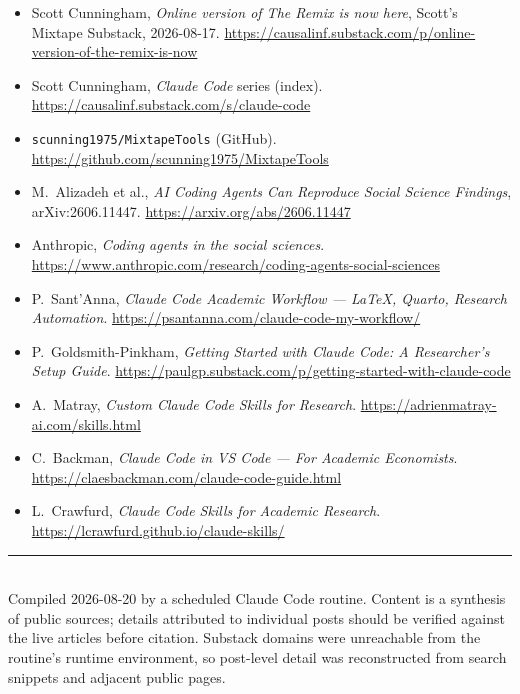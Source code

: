 \documentclass[11pt,a4paper]{article}
\begin{document}
\begin{itemize}[leftmargin=1.2em]
  \item Scott Cunningham, \emph{Online version of The Remix is now
        here}, Scott's Mixtape Substack, 2026-08-17.
        \url{https://causalinf.substack.com/p/online-version-of-the-remix-is-now}
  \item Scott Cunningham, \emph{Claude Code} series (index).
        \url{https://causalinf.substack.com/s/claude-code}
  \item \texttt{scunning1975/MixtapeTools} (GitHub).
        \url{https://github.com/scunning1975/MixtapeTools}
  \item M.\ Alizadeh et al., \emph{AI Coding Agents Can Reproduce
        Social Science Findings}, arXiv:2606.11447.
        \url{https://arxiv.org/abs/2606.11447}
  \item Anthropic, \emph{Coding agents in the social sciences}.
        \url{https://www.anthropic.com/research/coding-agents-social-sciences}
  \item P.\ Sant'Anna, \emph{Claude Code Academic Workflow --- \LaTeX,
        Quarto, Research Automation}.
        \url{https://psantanna.com/claude-code-my-workflow/}
  \item P.\ Goldsmith-Pinkham, \emph{Getting Started with Claude
        Code: A Researcher's Setup Guide}.
        \url{https://paulgp.substack.com/p/getting-started-with-claude-code}
  \item A.\ Matray, \emph{Custom Claude Code Skills for Research}.
        \url{https://adrienmatray-ai.com/skills.html}
  \item C.\ Backman, \emph{Claude Code in VS Code --- For Academic
        Economists}. \url{https://claesbackman.com/claude-code-guide.html}
  \item L.\ Crawfurd, \emph{Claude Code Skills for Academic
        Research}. \url{https://lcrawfurd.github.io/claude-skills/}
\end{itemize}

\vfill
\noindent\rule{\linewidth}{0.4pt}\\
{\small Compiled 2026-08-20 by a scheduled Claude Code routine.
Content is a synthesis of public sources; details attributed to
individual posts should be verified against the live articles before
citation. Substack domains were unreachable from the routine's
runtime environment, so post-level detail was reconstructed from
search snippets and adjacent public pages.}
\end{document}
